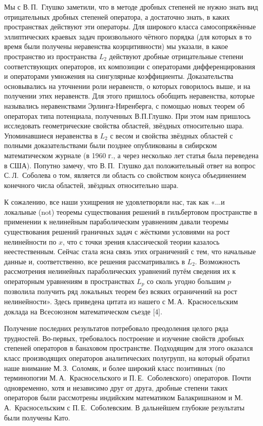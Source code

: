 Мы с В.\,П.~Глушко заметили, что в методе дробных степеней не нужно знать вид отрицательных дробных степеней оператора,
а достаточно знать, в каких пространствах действуют эти операторы.
Для широкого класса самосопряжённые эллиптических краевых задач произвольного чётного порядка
(для которых в то время были получены неравенства коэрцитивности) мы указали, в какое пространство из пространства $L_2$
действуют дробные отрицательные степени соответствующих операторов,
их композиции с операторами дифференцирования и операторами умножения на сингулярные коэффициенты.
Доказательства основывались на уточнении роли неравенств, о которых говорилось выше, и на получении этих неравенств.
Для этого пришлось обобщить неравенства, которые назывались неравенствами Эрлинга-Ниренберга,
с помощью новых теорем об операторах типа потенциала, полученных В.П.Глушко.
При этом нам пришлось исследовать геометрические свойства областей, звёздных относительно шара.
Упоминавшиеся неравенства в $L_2$
с весом и свойства звёздных областей с полными доказательствами были позднее опубликованы
в сибирском математическом журнале (в 1960 г., а через несколько лет статья была переведена в США).
Попутно замечу, что В.\,П.~Глушко дал положительный ответ на вопрос С.\,Л.~Соболева о том, является ли область со свойством конуса объединением конечного числа областей, звёздных относительно шара.

К сожалению, все наши ухищрения не удовлетворяли нас,
так как «...и локальные (not) теоремы существования решений в гильбертовом пространстве
в применении к нелинейным параболическим уравнениям давали теоремы существования решений граничных задач
с жёсткими условиями на рост нелинейности по $x$,
что с точки зрения классической теории казалось неестественным.
Сейчас стала ясна связь этих ограничений с тем, что начальные данные и, соответственно,
все решения рассматривались в $L_2$.
Возможность рассмотрения нелинейных параболических уравнений путём сведения их к операторным уравнениям в пространствах $L_p$
со сколь угодно большим $p$ позволила получить ряд локальных теорем без всяких ограничений на рост нелинейности».
Здесь приведена цитата из нашего с М.\,А.~Красносельским доклада на Всесоюзном математическом съезде [4].

Получение последних результатов потребовало преодоления целого ряда трудностей.
Во-первых, требовалось построение и изучение свойств дробных степеней операторов в банаховом пространстве.
Подходящим для этого оказался класс производящих операторов аналитических полугрупп,
на который обратил наше внимание М.\,З.~Соломяк, и более широкий класс позитивных
(по терминопогии М.\,А.~Красносельского и П.\,Е.~Соболевского) операторов. Почти одновременно, хотя и независимо друг от друга, дробные степени таких операторов были рассмотрены индийским математиком Балакришнаном и М.\,А.~Красносельским с П.\,Е.~Соболевским. В дальнейшем глубокие результаты были получены Като.

